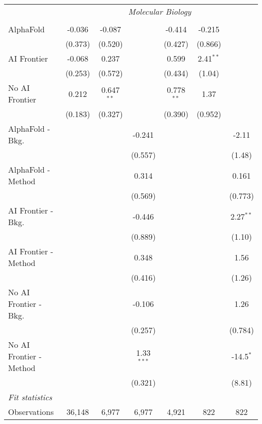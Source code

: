 \begin{tabular}{lcccccc}
 & \multicolumn{6}{c}{\textit{Molecular Biology}} \\ \\
   AlphaFold               & -0.036  & -0.087       &              & -0.414       & -0.215      &   \\   
                           & (0.373) & (0.520)      &              & (0.427)      & (0.866)     &   \\   
   AI Frontier             & -0.068  & 0.237        &              & 0.599        & 2.41$^{**}$ &   \\   
                           & (0.253) & (0.572)      &              & (0.434)      & (1.04)      &   \\   
   No AI Frontier          & 0.212   & 0.647$^{**}$ &              & 0.778$^{**}$ & 1.37        &   \\   
                           & (0.183) & (0.327)      &              & (0.390)      & (0.952)     &   \\   
   AlphaFold - Bkg.        &         &              & -0.241       &              &             & -2.11\\   
                           &         &              & (0.557)      &              &             & (1.48)\\   
   AlphaFold - Method      &         &              & 0.314        &              &             & 0.161\\   
                           &         &              & (0.569)      &              &             & (0.773)\\   
   AI Frontier - Bkg.      &         &              & -0.446       &              &             & 2.27$^{**}$\\   
                           &         &              & (0.889)      &              &             & (1.10)\\   
   AI Frontier - Method    &         &              & 0.348        &              &             & 1.56\\   
                           &         &              & (0.416)      &              &             & (1.26)\\   
   No AI Frontier - Bkg.   &         &              & -0.106       &              &             & 1.26\\   
                           &         &              & (0.257)      &              &             & (0.784)\\   
   No AI Frontier - Method &         &              & 1.33$^{***}$ &              &             & -14.5$^{*}$\\   
                           &         &              & (0.321)      &              &             & (8.81)\\   
   \midrule
   \emph{Fit statistics}\\
   Observations            & 36,148  & 6,977        & 6,977        & 4,921        & 822         & 822\\  
   

\end{tabular}
